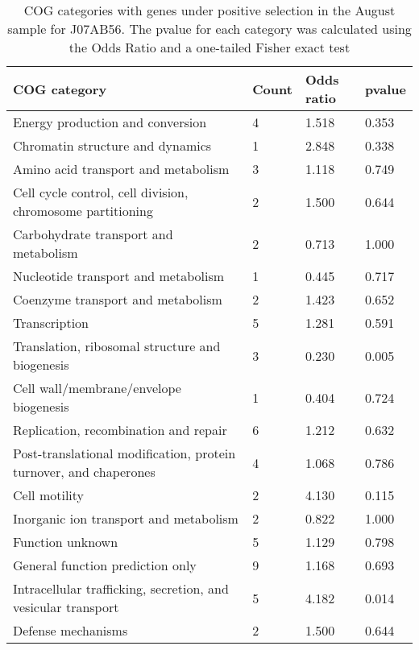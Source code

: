 \begin{table}[hb]
\footnotesize 
	\tabcolsep=0.11cm 
\caption{COG categories with genes under positive selection in the August sample for J07AB56. The pvalue for each category was calculated using the Odds Ratio and a one-tailed Fisher exact test} 
\begin{tabularx}{\textwidth}{L{6cm}R{2cm}R{2cm}R{2cm}} 
\hline 
\textbf{COG category} & \textbf{Count} & \textbf{Odds ratio} & \textbf{pvalue} \\ 
\hline 
Energy production and conversion & 4 & 1.518 & 0.353 \\ 
Chromatin structure and dynamics & 1 & 2.848 & 0.338 \\ 
Amino acid transport and metabolism & 3 & 1.118 & 0.749 \\ 
Cell cycle control, cell division, chromosome partitioning & 2 & 1.500 & 0.644 \\ 
Carbohydrate transport and metabolism & 2 & 0.713 & 1.000 \\ 
Nucleotide transport and metabolism & 1 & 0.445 & 0.717 \\ 
Coenzyme transport and metabolism & 2 & 1.423 & 0.652 \\ 
Transcription & 5 & 1.281 & 0.591 \\ 
Translation, ribosomal structure and biogenesis & 3 & 0.230 & 0.005 \\ 
Cell wall/membrane/envelope biogenesis & 1 & 0.404 & 0.724 \\ 
Replication, recombination and repair & 6 & 1.212 & 0.632 \\ 
Post-translational modification, protein turnover, and chaperones & 4 & 1.068 & 0.786 \\ 
Cell motility & 2 & 4.130 & 0.115 \\ 
Inorganic ion transport and metabolism & 2 & 0.822 & 1.000 \\ 
Function unknown & 5 & 1.129 & 0.798 \\ 
General function prediction only & 9 & 1.168 & 0.693 \\ 
Intracellular trafficking, secretion, and vesicular transport & 5 & 4.182 & 0.014 \\ 
Defense mechanisms & 2 & 1.500 & 0.644 \\ 
\end{tabularx} 
\label{August_COG_Selection_J07AB56} 
 \end{table} 

